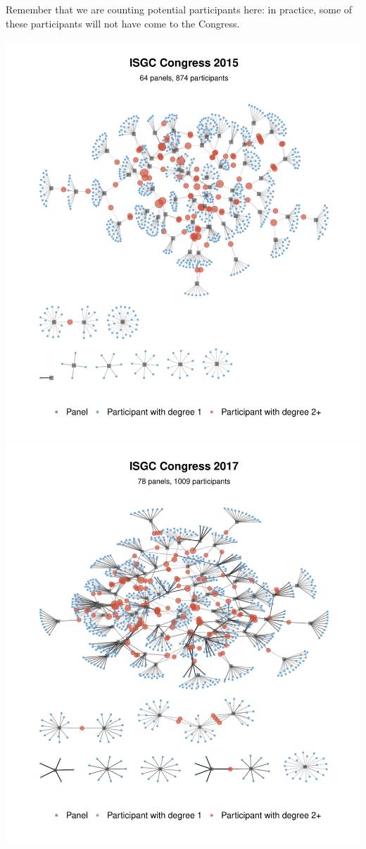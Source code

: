 \documentclass[
]{article}
\begin{document}
Remember that we are counting potential participants here: in practice,
some of these participants will not have come to the Congress.

\includegraphics[width=33.33in]{plots/congres-isgc2015-2mode}
\includegraphics[width=33.33in]{plots/congres-isgc2017-2mode}
\end{document}
